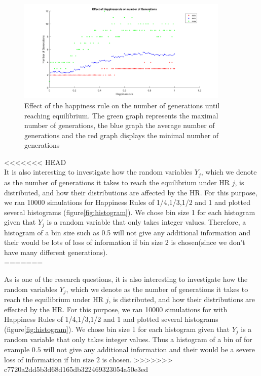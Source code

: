 \begin{figure}[h!]
    \centering
    \includegraphics[width=0.9\textwidth]{happinessregel_aantgen_2.pdf}
    \caption{Effect of the happiness rule on the number of generations until reaching equilibrium. 
    The green graph represents the maximal number of generations, the blue graph the average number of generations and the red graph displays the minimal number of generations}
    \label{fig:avegen}
\end{figure}
<<<<<<< HEAD
\\
It is also interesting to investigate how the random variables $Y_j$, which we denote as the number of generations it takes to reach the equilibrium under HR $j$, is distributed, and how their distributions are affected by the HR. For this purpose, we ran 10000 simulations for Happiness Rules of 1/4,1/3,1/2 and 1 and plotted several histograms (figure\ref{fig:histogram}). We chose bin size 1 for each histogram given that $Y_j$ is a random variable that only takes integer values. Therefore, a histogram of a bin size such as 0.5 will not give any additional information and their would be lots of loss of information if bin size 2 is chosen(since we don't have many different generations). 
\\
=======

As is one of the research questions, it is also interesting to investigate how the random variables $Y_j$, which we denote as the number of generations it takes to reach the equilibrium under HR $j$, is distributed, and how their distributions are effected by the HR. 
For this purpose, we ran 10000 simulations for with Happiness Rules of 1/4,1/3,1/2 and 1 and plotted several histograms (figure\ref{fig:histogram}). 
We chose bin size 1 for each histogram given that $Y_j$ is a random variable that only takes integer values. 
Thus a histogram of a bin of for example $0.5$ will not give any additional information and their would be a severe loss of information if bin size $2$ is chosen. 
>>>>>>> c7720a2dd5b3d68d165db322469323054a50e3ed

